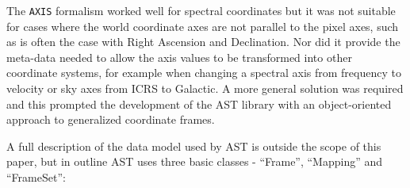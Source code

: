 \documentclass[final,authoryear,5p,times,twocolumn]{elsarticle}
\begin{document}
The \texttt{AXIS} formalism worked well for spectral coordinates but
it was not suitable for cases where the world coordinate axes are not
parallel to the pixel axes, such as is often the case with Right
Ascension and Declination. Nor did it provide the meta-data needed to
allow the axis values to be transformed into other coordinate systems,
for example when changing a spectral axis from frequency to velocity or
sky axes from ICRS to Galactic. A more general solution was required and this
prompted the development of the AST library
\citep[][]{1998ASPC..145...41W} with an object-oriented approach to
generalized coordinate frames.

A full description of the data model used by AST is outside the scope of
this paper, but in outline AST uses three basic classes - ``Frame'',
``Mapping'' and ``FrameSet'':
\end{document}
